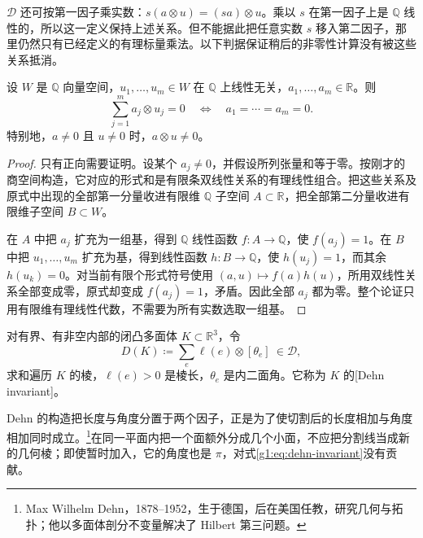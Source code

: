 \ProseParagraphBreak

\(\mathcal D\) 还可按第一因子乘实数：\(s(a\otimes u)=(sa)\otimes u\)。乘以 \(s\) 在第一因子上是 \(\mathbb Q\) 线性的，所以这一定义保持上述关系。但不能据此把任意实数 \(s\) 移入第二因子，那里仍然只有已经定义的有理标量乘法。以下判据保证稍后的非零性计算没有被这些关系抵消。

\begin{lemma}
	\label{g1:lem:rational-tensor-detection}
	设 \(W\) 是 \(\mathbb Q\) 向量空间，\(u_1,\ldots,u_m\in W\) 在 \(\mathbb Q\) 上线性无关，\(a_1,\ldots,a_m\in\mathbb R\)。则
	\[
		\sum_{j=1}^m a_j\otimes u_j=0
		\quad\Longleftrightarrow\quad a_1=\cdots=a_m=0.
	\]
	特别地，\(a\ne0\) 且 \(u\ne0\) 时，\(a\otimes u\ne0\)。
\end{lemma}
\begin{proof}
	只有正向需要证明。设某个 \(a_j\ne0\)，并假设所列张量和等于零。按刚才的商空间构造，它对应的形式和是有限条双线性关系的有理线性组合。把这些关系及原式中出现的全部第一分量收进有限维 \(\mathbb Q\) 子空间 \(A\subset\mathbb R\)，把全部第二分量收进有限维子空间 \(B\subset W\)。

	在 \(A\) 中把 \(a_j\) 扩充为一组基，得到 \(\mathbb Q\) 线性函数 \(f:A\to\mathbb Q\)，使 \(f(a_j)=1\)。在 \(B\) 中把 \(u_1,\ldots,u_m\) 扩充为基，得到线性函数 \(h:B\to\mathbb Q\)，使 \(h(u_j)=1\)，而其余 \(h(u_k)=0\)。对当前有限个形式符号使用 \((a,u)\mapsto f(a)h(u)\)，所用双线性关系全部变成零，原式却变成 \(f(a_j)=1\)，矛盾。因此全部 \(a_j\) 都为零。整个论证只用有限维有理线性代数，不需要为所有实数选取一组基。
\end{proof}

\begin{definition}
	\label{g1:def:dehn-invariant-convex}
	对有界、有非空内部的闭凸多面体 \(K\subset\mathbb R^3\)，令
	\begin{equation}
		\label{g1:eq:dehn-invariant}
		D(K)\coloneqq\sum_{e}\ell(e)\otimes[\theta_e]
		\ \in\mathcal D,
	\end{equation}
	求和遍历 \(K\) 的棱，\(\ell(e)>0\) 是棱长，\(\theta_e\) 是内二面角。它称为 \(K\) 的[Dehn invariant]。
\end{definition}

Dehn 的构造把长度与角度分置于两个因子，正是为了使切割后的长度相加与角度相加同时成立。\footnote{Max Wilhelm Dehn，1878--1952，生于德国，后在美国任教，研究几何与拓扑；他以多面体剖分不变量解决了 Hilbert 第三问题。}在同一平面内把一个面额外分成几个小面，不应把分割线当成新的几何棱；即使暂时加入，它的角度也是 \(\pi\)，对式\eqref{g1:eq:dehn-invariant}没有贡献。

